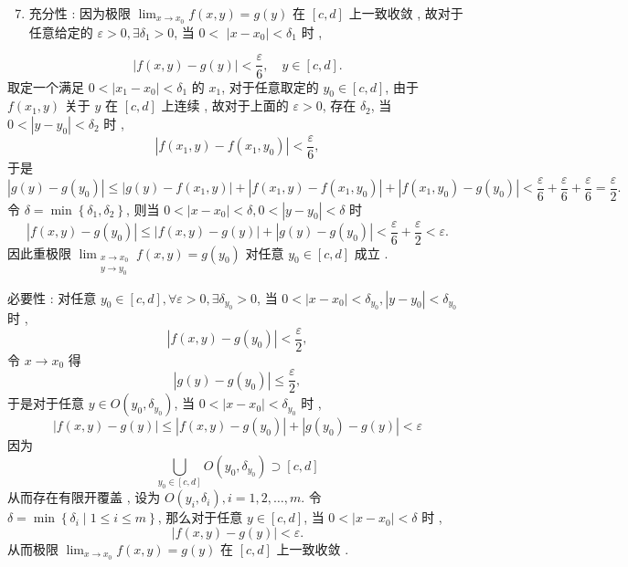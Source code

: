 \documentclass[10pt]{article}
\begin{document}
\begin{enumerate}
  \setcounter{enumi}{6}
  \item  充分性 :  因为极限  $\lim _{x \rightarrow x_{0}} f(x, y)=g(y)$  在  $[c, d]$  上一致收敛 ,  故对于任意给定的  $\varepsilon>0, \exists \delta_{1}>0$,  当  $0<$ $\left|x-x_{0}\right|<\delta_{1}$  时 ,
\end{enumerate}
$$
|f(x, y)-g(y)|<\frac{\varepsilon}{6}, \quad y \in[c, d] .
$$
 取定一个满足  $0<\left|x_{1}-x_{0}\right|<\delta_{1}$  的  $x_{1}$,  对于任意取定的  $y_{0} \in[c, d]$,  由于  $f\left(x_{1}, y\right)$  关于  $y$  在  $[c, d]$  上连续 ,  故对于上面的  $\varepsilon>0$,  存在  $\delta_{2}$,  当  $0<\left|y-y_{0}\right|<\delta_{2}$  时 ,
$$
\left|f\left(x_{1}, y\right)-f\left(x_{1}, y_{0}\right)\right|<\frac{\varepsilon}{6},
$$
 于是 
$$
\left|g(y)-g\left(y_{0}\right)\right| \leqslant\left|g(y)-f\left(x_{1}, y\right)\right|+\left|f\left(x_{1}, y\right)-f\left(x_{1}, y_{0}\right)\right|+\left|f\left(x_{1}, y_{0}\right)-g\left(y_{0}\right)\right|<\frac{\varepsilon}{6}+\frac{\varepsilon}{6}+\frac{\varepsilon}{6}=\frac{\varepsilon}{2} .
$$
 令  $\delta=\min \left\{\delta_{1}, \delta_{2}\right\}$,  则当  $0<\left|x-x_{0}\right|<\delta, 0<\left|y-y_{0}\right|<\delta$  时 
$$
\left|f(x, y)-g\left(y_{0}\right)\right| \leqslant|f(x, y)-g(y)|+\left|g(y)-g\left(y_{0}\right)\right|<\frac{\varepsilon}{6}+\frac{\varepsilon}{2}<\varepsilon .
$$
 因此重极限  $\lim _{\substack{x \rightarrow x_{0} \\ y \rightarrow y_{0}}} f(x, y)=g\left(y_{0}\right)$  对任意  $y_{0} \in[c, d]$  成立 .

 必要性 :  对任意  $y_{0} \in[c, d], \forall \varepsilon>0, \exists \delta_{y_{0}}>0$,  当  $0<\left|x-x_{0}\right|<\delta_{y_{0}},\left|y-y_{0}\right|<\delta_{y_{0}}$  时 ,
$$
\left|f(x, y)-g\left(y_{0}\right)\right|<\frac{\varepsilon}{2},
$$
 令  $x \rightarrow x_{0}$  得 
$$
\left|g(y)-g\left(y_{0}\right)\right| \leqslant \frac{\varepsilon}{2},
$$
 于是对于任意  $y \in O\left(y_{0}, \delta_{y_{0}}\right)$,  当  $0<\left|x-x_{0}\right|<\delta_{y_{0}}$  时 ,
$$
|f(x, y)-g(y)| \leqslant\left|f(x, y)-g\left(y_{0}\right)\right|+\left|g\left(y_{0}\right)-g(y)\right|<\varepsilon
$$
 因为 
$$
\bigcup_{y_{0} \in[c, d]} O\left(y_{0}, \delta_{y_{0}}\right) \supset[c, d]
$$
 从而存在有限开覆盖 ,  设为  $O\left(y_{i}, \delta_{i}\right), i=1,2, \ldots, m$.  令  $\delta=\min \left\{\delta_{i} \mid 1 \leqslant i \leqslant m\right\}$,  那么对于任意  $y \in[c, d]$,  当  $0<\left|x-x_{0}\right|<\delta$  时 ,
$$
|f(x, y)-g(y)|<\varepsilon .
$$
 从而极限  $\lim _{x \rightarrow x_{0}} f(x, y)=g(y)$  在  $[c, d]$  上一致收敛 .
\end{document}
